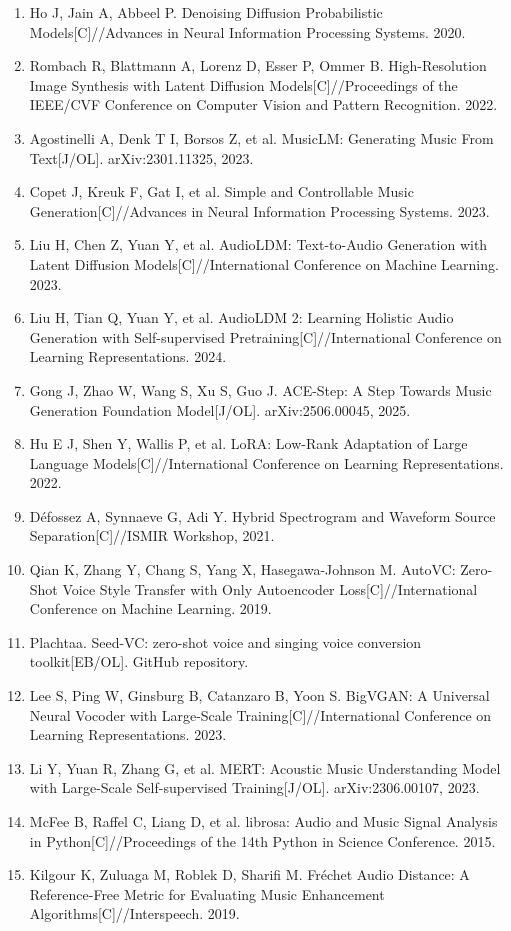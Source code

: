 \documentclass[UTF8,a4paper,zihao=-4,fontset=none]{ctexart}
\begin{document}
\begin{enumerate}[leftmargin=2em]
\item Ho J, Jain A, Abbeel P. Denoising Diffusion Probabilistic Models[C]//Advances in Neural Information Processing Systems. 2020.
\item Rombach R, Blattmann A, Lorenz D, Esser P, Ommer B. High-Resolution Image Synthesis with Latent Diffusion Models[C]//Proceedings of the IEEE/CVF Conference on Computer Vision and Pattern Recognition. 2022.
\item Agostinelli A, Denk T I, Borsos Z, et al. MusicLM: Generating Music From Text[J/OL]. arXiv:2301.11325, 2023.
\item Copet J, Kreuk F, Gat I, et al. Simple and Controllable Music Generation[C]//Advances in Neural Information Processing Systems. 2023.
\item Liu H, Chen Z, Yuan Y, et al. AudioLDM: Text-to-Audio Generation with Latent Diffusion Models[C]//International Conference on Machine Learning. 2023.
\item Liu H, Tian Q, Yuan Y, et al. AudioLDM 2: Learning Holistic Audio Generation with Self-supervised Pretraining[C]//International Conference on Learning Representations. 2024.
\item Gong J, Zhao W, Wang S, Xu S, Guo J. ACE-Step: A Step Towards Music Generation Foundation Model[J/OL]. arXiv:2506.00045, 2025.
\item Hu E J, Shen Y, Wallis P, et al. LoRA: Low-Rank Adaptation of Large Language Models[C]//International Conference on Learning Representations. 2022.
\item Défossez A, Synnaeve G, Adi Y. Hybrid Spectrogram and Waveform Source Separation[C]//ISMIR Workshop, 2021.
\item Qian K, Zhang Y, Chang S, Yang X, Hasegawa-Johnson M. AutoVC: Zero-Shot Voice Style Transfer with Only Autoencoder Loss[C]//International Conference on Machine Learning. 2019.
\item Plachtaa. Seed-VC: zero-shot voice and singing voice conversion toolkit[EB/OL]. GitHub repository.
\item Lee S, Ping W, Ginsburg B, Catanzaro B, Yoon S. BigVGAN: A Universal Neural Vocoder with Large-Scale Training[C]//International Conference on Learning Representations. 2023.
\item Li Y, Yuan R, Zhang G, et al. MERT: Acoustic Music Understanding Model with Large-Scale Self-supervised Training[J/OL]. arXiv:2306.00107, 2023.
\item McFee B, Raffel C, Liang D, et al. librosa: Audio and Music Signal Analysis in Python[C]//Proceedings of the 14th Python in Science Conference. 2015.
\item Kilgour K, Zuluaga M, Roblek D, Sharifi M. Fréchet Audio Distance: A Reference-Free Metric for Evaluating Music Enhancement Algorithms[C]//Interspeech. 2019.
\end{enumerate}
\end{document}
